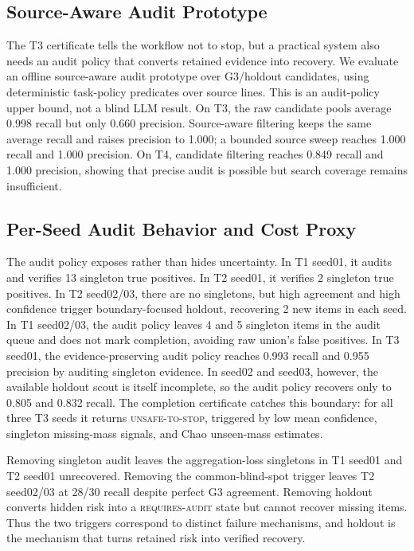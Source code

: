 \documentclass[letterpaper]{article}
\begin{document}
\subsection{Source-Aware Audit Prototype}

The T3 certificate tells the workflow not to stop, but a practical system also
needs an audit policy that converts retained evidence into recovery. We evaluate
an offline source-aware audit prototype over G3/holdout candidates, using
deterministic task-policy predicates over source lines. This is an audit-policy
upper bound, not a blind LLM result. On T3, the raw candidate pools average
0.998 recall but only 0.660 precision. Source-aware filtering keeps the same
average recall and raises precision to 1.000; a bounded source sweep reaches
1.000 recall and 1.000 precision. On T4, candidate filtering reaches 0.849
recall and 1.000 precision, showing that precise audit is possible but search
coverage remains insufficient.

\subsection{Per-Seed Audit Behavior and Cost Proxy}

The audit policy exposes rather than hides uncertainty. In T1 seed01, it audits
and verifies 13 singleton true positives. In T2 seed01, it verifies 2 singleton
true positives. In T2 seed02/03, there are no singletons, but high agreement and
high confidence trigger boundary-focused holdout, recovering 2 new items in each
seed. In T1 seed02/03, the audit policy leaves 4 and 5 singleton items in the
audit queue and does not mark completion, avoiding raw union's false positives.
In T3 seed01, the evidence-preserving audit policy reaches 0.993 recall and
0.955 precision by auditing singleton evidence. In seed02 and seed03, however,
the available holdout scout is itself incomplete, so the audit policy recovers
only to 0.805 and 0.832 recall. The completion certificate catches this boundary:
for all three T3 seeds it returns \textsc{unsafe-to-stop}, triggered by low mean
confidence, singleton missing-mass signals, and Chao unseen-mass estimates.

Removing singleton audit leaves the aggregation-loss singletons in T1 seed01 and
T2 seed01 unrecovered. Removing the common-blind-spot trigger leaves T2
seed02/03 at 28/30 recall despite perfect G3 agreement. Removing holdout
converts hidden risk into a \textsc{requires-audit} state but cannot recover
missing items. Thus the two triggers correspond to distinct failure mechanisms,
and holdout is the mechanism that turns retained risk into verified recovery.
\end{document}
